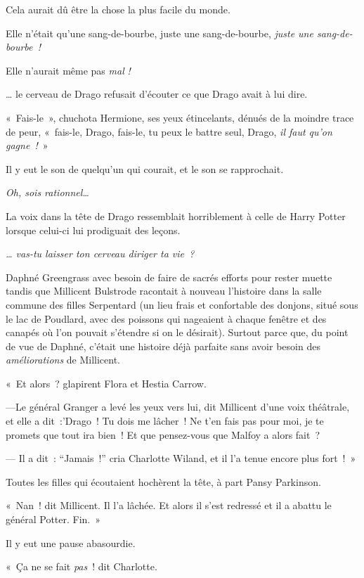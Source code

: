 Cela aurait dû être la chose la plus facile du monde.

Elle n'était qu'une sang-de-bourbe, juste une sang-de-bourbe, \emph{juste une sang-de-bourbe~!}

Elle n'aurait même pas \emph{mal} \emph{!}

… le cerveau de Drago refusait d'écouter ce que Drago avait à lui dire.

«~Fais-le~», chuchota Hermione, ses yeux étincelants, dénués de la moindre trace de peur, «~fais-le, Drago, fais-le, tu peux le battre seul, Drago, \emph{il faut qu'on gagne~!}~»

Il y eut le son de quelqu'un qui courait, et le son se rapprochait.

\emph{Oh, sois rationnel…}

La voix dans la tête de Drago ressemblait horriblement à celle de Harry Potter lorsque celui-ci lui prodiguait des leçons.

\emph{… vas-tu laisser ton cerveau diriger ta vie~?}


Daphné Greengrass avec besoin de faire de sacrés efforts pour rester muette tandis que Millicent Bulstrode racontait à nouveau l'histoire dans la salle commune des filles Serpentard (un lieu frais et confortable des donjons, situé sous le lac de Poudlard, avec des poissons qui nageaient à chaque fenêtre et des canapés où l'on pouvait s'étendre si on le désirait).
Surtout parce que, du point de vue de Daphné, c'était une histoire déjà parfaite sans avoir besoin des \emph{améliorations} de Millicent.

«~Et alors~? glapirent Flora et Hestia Carrow.

---Le général Granger a levé les yeux vers lui, dit Millicent d'une voix théâtrale, et elle a dit~:'Drago~!
Tu dois me lâcher~!
Ne t'en fais pas pour moi, je te promets que tout ira bien~!
Et que pensez-vous que Malfoy a alors fait~?

--- Il a dit~: “Jamais~!” cria Charlotte Wiland, et il l'a tenue encore plus fort~!~»

Toutes les filles qui écoutaient hochèrent la tête, à part Pansy Parkinson.

«~Nan~! dit Millicent.
Il l'a lâchée.
Et alors il s'est redressé et il a abattu le général Potter.
Fin.~»

Il y eut une pause abasourdie.

«~Ça ne se fait \emph{pas}~! dit Charlotte.

